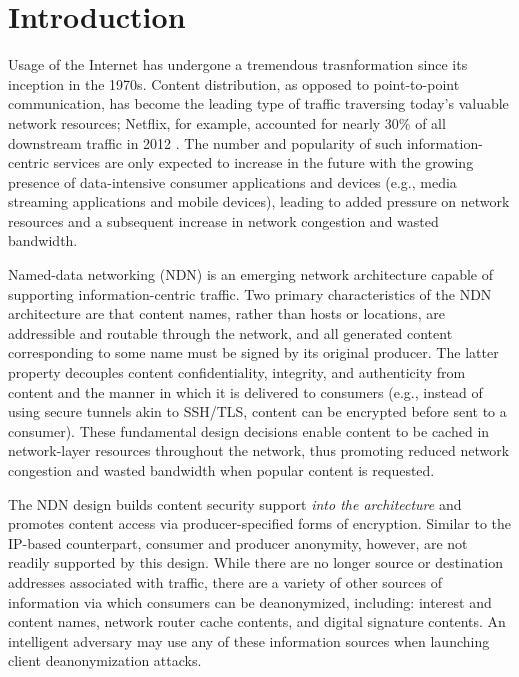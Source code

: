 \section{Introduction} \label{sec:introduction}
Usage of the Internet has undergone a tremendous trasnformation since its inception in the 1970s. Content distribution, as opposed to point-to-point communication, has become the leading type of traffic traversing today's valuable network resources; Netflix, for example, accounted for nearly 30\% of all downstream traffic in 2012 \cite{Netflix}. The number and popularity of such information-centric services are only expected to increase in the future with the growing presence of data-intensive consumer applications and devices (e.g., media streaming applications and mobile devices), leading to added pressure on network resources and a subsequent increase in network congestion and wasted bandwidth. 

Named-data networking (NDN) \cite{ndn-techreport} is an emerging network architecture capable of supporting information-centric traffic. Two primary characteristics of the NDN architecture are that content names, rather than hosts or locations, are addressible and routable through the network, and all generated content corresponding to some name must be signed by its original producer. The latter property decouples content confidentiality, integrity, and authenticity from content and the manner in which it is delivered to consumers (e.g., instead of using secure tunnels akin to SSH/TLS, content can be encrypted before sent to a consumer). These fundamental design decisions enable content to be cached in network-layer resources throughout the network, thus promoting reduced network congestion and wasted bandwidth when popular content is requested. 

The NDN design builds content security support \emph{into the architecture} and promotes content access via producer-specified forms of encryption. Similar to the IP-based counterpart, consumer and producer anonymity, however, are not readily supported by this design. While there are no longer source or destination addresses associated with traffic, there are a variety of other sources of information via which consumers can be deanonymized, including: interest and content names, network router cache contents, and digital signature contents. An intelligent adversary may use any of these information sources when launching client deanonymization attacks. 

